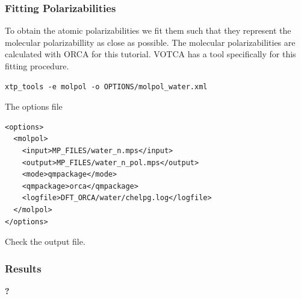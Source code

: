 \documentclass[t,aspectratio=169, 8pt]{beamer}
\begin{document}
\begin{frame}[fragile]
  \frametitle{Fitting Polarizabilities}  
  To obtain the atomic polarizabilities we fit them such that they represent the
  molecular polarizabillity as close as possible. The molecular polarizabilities
  are calculated with ORCA for this tutorial. VOTCA has a tool specifically for
  this fitting procedure.
  \begin{verbatim}
xtp_tools -e molpol -o OPTIONS/molpol_water.xml
  \end{verbatim}
  The options file
  \begin{verbatim}
<options>
  <molpol>
    <input>MP_FILES/water_n.mps</input>
    <output>MP_FILES/water_n_pol.mps</output>
    <mode>qmpackage</mode>
    <qmpackage>orca</qmpackage>
    <logfile>DFT_ORCA/water/chelpg.log</logfile>
  </molpol>
</options>
  \end{verbatim}
  Check the output file.
\end{frame}




\begin{chapterframe}
  \frametitle{Results}
  \vspace{0.5cm}
  \begin{center}
    {\fontsize{60}{64} \selectfont \bfseries{?}}
  \end{center}
\end{chapterframe}
\end{document}
